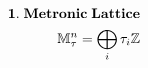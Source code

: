 \documentclass[preview]{standalone}
\begin{document}
\begin{align*}
\special{dvisvgm:raw <g id='unique000'>}\mathbf{1.\;Metronic\;Lattice}\\\mathbb{M}_\tau^n = \bigoplus_i \tau_i\mathbb{Z}\special{dvisvgm:raw </g>}
\end{align*}
\end{document}
